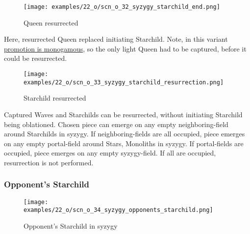 \clearpage %

\vspace*{-2.1\baselineskip}
\noindent
\begin{figure}[!h]
\texttt{[image: examples/22\_o/scn\_o\_32\_syzygy\_starchild\_end.png]}
\caption{Queen resurrected}
\label{fig:scn_o_32_syzygy_starchild_end}
\end{figure}

Here, resurrected Queen replaced initiating Starchild. Note, in this variant
\hyperref[sec:One/Promotion]{promotion is monogamous}, so the only light Queen
had to be captured, before it could be resurrected.

\clearpage %

\vspace*{-2.1\baselineskip}
\noindent
\begin{figure}[!h]
\texttt{[image: examples/22\_o/scn\_o\_33\_syzygy\_starchild\_resurrection.png]}
\caption{Starchild resurrected}
\label{fig:scn_o_33_syzygy_starchild_resurrection}
\end{figure}

Captured Waves and Starchilds can be resurrected, without initiating Starchild
being oblationed. Chosen piece can emerge on any empty neighboring-field around
Starchilds in syzygy. If neighboring-fields are all occupied, piece emerges on
any empty portal-field around Stars, Monoliths in syzygy. If portal-fields are
occupied, piece emerges on any empty syzygy-field. If all are occupied,
resurrection is not performed.

\clearpage %

\subsubsection*{Opponent's Starchild}

\vspace*{-1.2\baselineskip}
\noindent
\begin{figure}[!h]
\texttt{[image: examples/22\_o/scn\_o\_34\_syzygy\_opponents\_starchild.png]}
\caption{Opponent's Starchild in syzygy}
\label{fig:scn_o_34_syzygy_opponents_starchild}
\end{figure}

